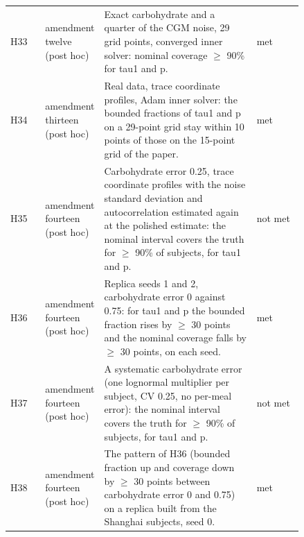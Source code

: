 {\begin{longtable}{lp{0.16\linewidth}p{0.52\linewidth}p{0.16\linewidth}}
H33 & amendment twelve (post hoc) & Exact carbohydrate and a quarter of the CGM noise, 29 grid points, converged inner solver: nominal coverage $\ge$ 90\% for tau1 and p. & met \\
H34 & amendment thirteen (post hoc) & Real data, trace coordinate profiles, Adam inner solver: the bounded fractions of tau1 and p on a 29-point grid stay within 10 points of those on the 15-point grid of the paper. & met \\
H35 & amendment fourteen (post hoc) & Carbohydrate error 0.25, trace coordinate profiles with the noise standard deviation and autocorrelation estimated again at the polished estimate: the nominal interval covers the truth for $\ge$ 90\% of subjects, for tau1 and p. & not met \\
H36 & amendment fourteen (post hoc) & Replica seeds 1 and 2, carbohydrate error 0 against 0.75: for tau1 and p the bounded fraction rises by $\ge$ 30 points and the nominal coverage falls by $\ge$ 30 points, on each seed. & met \\
H37 & amendment fourteen (post hoc) & A systematic carbohydrate error (one lognormal multiplier per subject, CV 0.25, no per-meal error): the nominal interval covers the truth for $\ge$ 90\% of subjects, for tau1 and p. & not met \\
H38 & amendment fourteen (post hoc) & The pattern of H36 (bounded fraction up and coverage down by $\ge$ 30 points between carbohydrate error 0 and 0.75) on a replica built from the Shanghai subjects, seed 0. & met \\
\bottomrule
\end{longtable}
}
